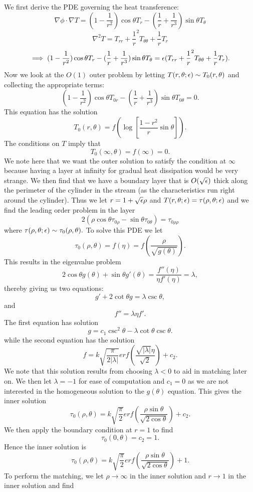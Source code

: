 We first derive the PDE governing the heat transference:
$$\nabla\phi\cdot\nabla T=(1-\frac{1}{r^2})\cos\theta T_r-(\frac{1}{r}+\frac{1}{r^3})\sin\theta T_\theta$$
$$\nabla^2 T= T_{rr}+\frac{1}{r}^2 T_{\theta\theta}+\frac{1}{r}T_r$$
$$\implies (1-\frac{1}{r^2})\cos\theta T_r-(\frac{1}{r}+\frac{1}{r^3})\sin\theta T_\theta=\epsilon(T_{rr}+\frac{1}{r}^2 T_{\theta\theta}+\frac{1}{r}T_r).$$
Now we look at the $O(1)$ outer problem by letting $T(r,\theta;\epsilon)\sim T_0(r,\theta)$ and collecting the appropriate terms:
$$(1-\frac{1}{r^2})\cos\theta T_{0r}-(\frac{1}{r}+\frac{1}{r^3})\sin\theta T_{0\theta}=0.$$
This equation has the solution
$$T_0(r,\theta)=f\left(\log\left[\frac{1-r^2}{r}\sin\theta\right]\right).$$
The conditions on $T$ imply that 
$$T_0(\infty,\theta)=f(\infty)=0.$$
We note here that we want the outer solution to satisfy the condition at $\infty$ because having a layer at infinity for gradual heat dissipation would be very strange. We then find that we have a boundary layer that is $O(\sqrt{\epsilon})$ thick along the perimeter of the cylinder in the stream (as the characteristics run right around the cylinder). Thus we let $r=1+\sqrt{\epsilon}\rho$ and $T(r,\theta;\epsilon)=\tau(\rho,\theta;\epsilon)$ and we find the leading order problem in the layer
$$2(\rho\cos\theta \tau_{0\rho}-\sin\theta\tau_{0\theta})=\tau_{0\rho\rho}$$
where $\tau(\rho,\theta;\epsilon)\sim\tau_0(\rho,\theta).$ To solve this PDE we let
$$\tau_0(\rho,\theta)=f(\eta)=f\left(\frac{\rho}{\sqrt{g(\theta)}}\right).$$
This results in the eigenvalue problem
$$2\cos\theta g(\theta)+\sin\theta g'(\theta)=\frac{f''(\eta)}{\eta f'(\eta)}=\lambda,$$
thereby giving us two equations:
$$g'+2\cot\theta g=\lambda\csc\theta,$$
and
$$f''=\lambda\eta f'.$$
The first equation has solution
$$g=c_1\csc^2\theta-\lambda\cot\theta\csc\theta.$$
while the second equation has the solution
$$f=k\sqrt{\frac{\pi}{2|\lambda|}}erf\left(\frac{\sqrt{|\lambda|}\eta}{\sqrt{2}}\right)+c_2.$$
We note that this solution results from choosing $\lambda<0$ to aid in matching later on. We then let $\lambda=-1$ for ease of computation and $c_1=0$ as we are not interested in the homogeneous solution to the $g(\theta)$ equation. This gives the inner solution
$$\tau_0(\rho,\theta)=k\sqrt{\frac{\pi}{2}}erf\left(\frac{\rho\sin\theta}{\sqrt{2\cos\theta}}\right)+c_2.$$
We then apply the boundary condition at $r=1$ to find
$$\tau_0(0,\theta)=c_2=1.$$
Hence the inner solution is
$$\tau_0(\rho,\theta)=k\sqrt{\frac{\pi}{2}}erf\left(\frac{\rho\sin\theta}{\sqrt{2\cos\theta}}\right)+1.$$
To perform the matching, we let $\rho\to \infty$ in the inner solution and $r\to 1$ in the inner solution and find
